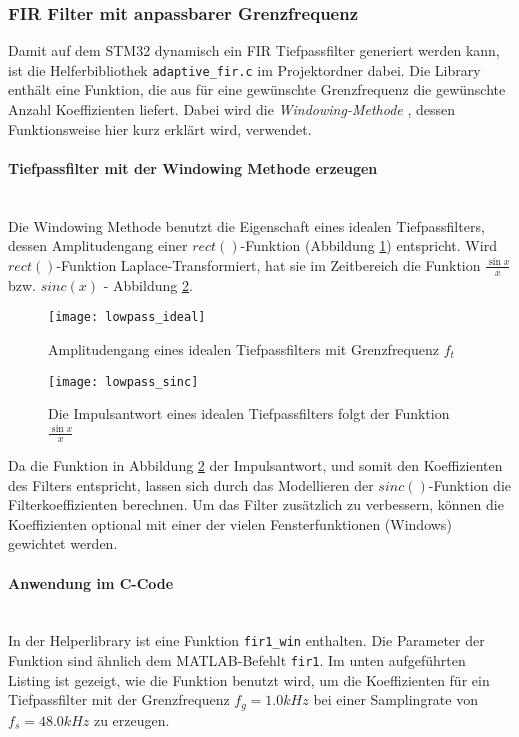 \subsubsection{FIR Filter mit anpassbarer Grenzfrequenz}
\label{sec:LibFIRAdaptive}

Damit auf dem STM32 dynamisch ein FIR Tiefpassfilter generiert werden kann, ist die Helferbibliothek \texttt{adaptive\_fir.c} im Projektordner dabei.
Die Library enthält eine Funktion, die aus für eine gewünschte Grenzfrequenz die gewünschte Anzahl Koeffizienten liefert.
Dabei wird die \textit{Windowing-Methode} \cite{FIR-Windowing}, dessen Funktionsweise hier kurz erklärt wird, verwendet.
\\
\paragraph{Tiefpassfilter mit der Windowing Methode erzeugen}\vspace{-0.3cm}\\
Die Windowing Methode benutzt die Eigenschaft eines idealen Tiefpassfilters, dessen Amplitudengang einer $rect()$-Funktion (Abbildung \ref{pic:lowpass_ideal}) entspricht.
Wird $rect()$-Funktion Laplace-Transformiert, hat sie im Zeitbereich die Funktion $\frac{\sin{x}}{x}$ bzw. $sinc(x)$ - Abbildung \ref{pic:lowpass_sinc}.

\begin{figure}[H]
	\centering
	\texttt{[image: lowpass\_ideal]}
	\caption{Amplitudengang eines idealen Tiefpassfilters mit Grenzfrequenz $f_t$ \cite{FIR-Windowing}}
	\label{pic:lowpass_ideal}
\end{figure}

\begin{figure}[H]
	\centering
	\texttt{[image: lowpass\_sinc]}
	\caption{Die Impulsantwort eines idealen Tiefpassfilters folgt der Funktion $\frac{\sin{x}}{x}$ \cite{FIR-Windowing}}
	\label{pic:lowpass_sinc}
\end{figure}

Da die Funktion in Abbildung \ref{pic:lowpass_sinc} der Impulsantwort, und somit den Koeffizienten des Filters entspricht, lassen sich durch das Modellieren der $sinc()$-Funktion die Filterkoeffizienten berechnen.
Um das Filter zusätzlich zu verbessern, können die Koeffizienten optional mit einer der vielen Fensterfunktionen (Windows) gewichtet werden.
\\
\paragraph{Anwendung im C-Code}\vspace{-0.3cm}\\
In der Helperlibrary ist eine Funktion \texttt{fir1\_win} enthalten.
Die Parameter der Funktion sind ähnlich dem MATLAB-Befehlt \texttt{fir1}.
Im unten aufgeführten Listing ist gezeigt, wie die Funktion benutzt wird, um die Koeffizienten für ein Tiefpassfilter mit der Grenzfrequenz $f_g=1.0\si{kHz}$ bei einer Samplingrate von $f_s=48.0\si{kHz}$ zu erzeugen.\\

